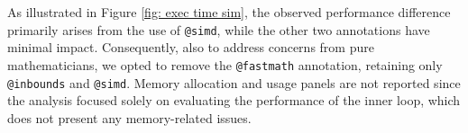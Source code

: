 \documentclass[12pt,	%
	a4paper,		%
	twoside,		%
	openright,		%
	titlepage,%
	]{book}
\theoremstyle{definition}
\newcommand{\mjline}[1]{\texttt{#1}}
\begin{document}
As illustrated in Figure \ref{fig: exec time sim}, the observed performance difference primarily arises from the use of \mjline{@simd}, while the other two annotations have minimal impact. Consequently, also to address concerns from pure mathematicians, we opted to remove the \mjline{@fastmath} annotation, retaining only \mjline{@inbounds} and \mjline{@simd}. Memory allocation and usage panels are not reported since the analysis focused solely on evaluating the performance of the inner loop, which does not present any memory-related issues.
\end{document}
